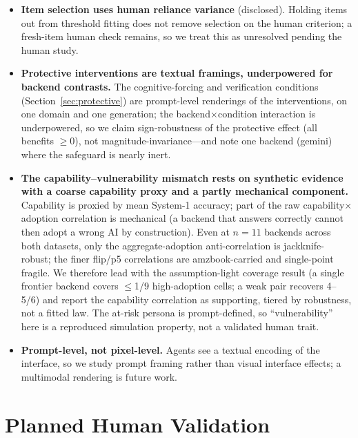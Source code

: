 \documentclass[manuscript,nonacm]{acmart}
\begin{document}
\begin{itemize}
  decision threshold, but a full specification-curve/multiverse analysis~\cite{simonsohn2020specification}
  over parsing rules, heterogeneity metrics, and conflict-conditioning choices is future work.
  \item \textbf{Item selection uses human reliance variance} (disclosed). Holding items out from threshold
  fitting does not remove selection on the human criterion; a fresh-item human check remains, so we treat
  this as unresolved pending the human study.
  \item \textbf{Protective interventions are textual framings, underpowered for backend contrasts.} The
  cognitive-forcing and verification conditions (Section~\ref{sec:protective}) are prompt-level renderings
  of the interventions, on one domain and one generation; the backend$\times$condition interaction is
  underpowered, so we claim sign-robustness of the protective effect (all benefits $\ge0$), not
  magnitude-invariance---and note one backend (gemini) where the safeguard is nearly inert.
  \item \textbf{The capability--vulnerability mismatch rests on synthetic evidence with a coarse capability
  proxy and a partly mechanical component.} Capability is proxied by mean System-1 accuracy; part of the raw
  capability$\times$adoption correlation is mechanical (a backend that answers correctly cannot then adopt a
  wrong AI by construction). Even at $n=11$ backends across both datasets, only the aggregate-adoption
  anti-correlation is jackknife-robust; the finer flip/p5 correlations are amzbook-carried and single-point
  fragile. We therefore lead with the assumption-light coverage result (a single frontier backend covers
  $\leq$1/9 high-adoption cells; a weak pair recovers 4--5/6) and report the capability correlation as
  supporting, tiered by robustness, not a fitted law. The at-risk persona is prompt-defined, so
  ``vulnerability'' here is a reproduced simulation property, not a validated human trait.
  \item \textbf{Prompt-level, not pixel-level.} Agents see a textual encoding of the interface, so we study
  prompt framing rather than visual interface effects; a multimodal rendering is future work.
\end{itemize}

\section{Planned Human Validation}
\label{sec:e6}
\end{document}
